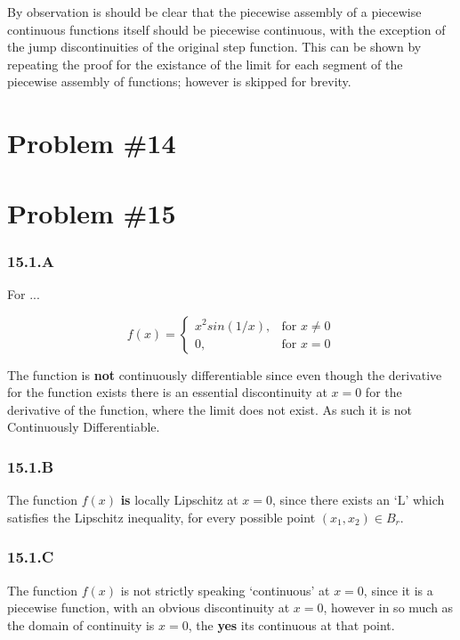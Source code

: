 \documentclass[12px]{article}
\begin{document}
By observation is should be clear that the piecewise assembly of a piecewise continuous functions itself should be piecewise continuous, with the exception of the jump discontinuities of the original step function. This can be shown by repeating the proof for the existance of the limit for each segment of the piecewise assembly of functions; however is skipped for brevity.


\section{Problem \#14}




\section{Problem \#15}

\subsubsection*{15.1.A}
For ...

$$
f(x) =
\begin{cases}
    x^{2}sin(1/x), & \text{for $x\neq0 $} \\
    0, & \text{for $x =0$}
\end{cases}
$$

The function is \textbf{not} continuously differentiable since even though the derivative for the function exists there is an essential discontinuity at $x =0$ for the derivative of the function, where the limit does not exist. As such it is not Continuously Differentiable.
\subsubsection*{15.1.B}

The function $f(x)$ \textbf{is} locally Lipschitz at $x=0$, since there exists an `L' which satisfies the Lipschitz inequality, for every possible point $(x_1, x_2) \in B_r  $.

\subsubsection*{15.1.C}

The function $f(x)$ is not strictly speaking `continuous' at $x=0$, since it is a piecewise function, with an obvious discontinuity at $x=0$, however in so much as the domain of continuity is $x=0$, the \textbf{yes} its continuous at that point.
\end{document}

